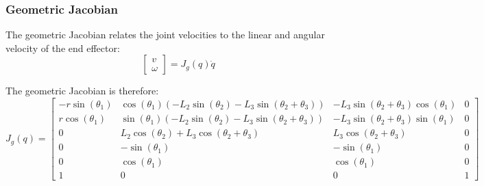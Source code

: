 \documentclass[12pt,a4paper]{article}
\begin{document}
\subsubsection*{Geometric Jacobian}
The geometric Jacobian relates the joint velocities to the linear and angular
velocity of the end effector:
\[ \begin{bmatrix} v \\ \omega \end{bmatrix} = J_g(q) \dot{q} \]

The geometric Jacobian is therefore:
\[
J_g(q) = \begin{bmatrix}
-r \sin(\theta_1) & \cos(\theta_1)(-L_2 \sin(\theta_2) - L_3 \sin(\theta_2 + \theta_3)) & -L_3 \sin(\theta_2 + \theta_3) \cos(\theta_1) & 0 \\
r \cos(\theta_1) & \sin(\theta_1)(-L_2 \sin(\theta_2) - L_3 \sin(\theta_2 + \theta_3)) & -L_3 \sin(\theta_2 + \theta_3) \sin(\theta_1) & 0 \\
0 & L_2 \cos(\theta_2) + L_3 \cos(\theta_2 + \theta_3) & L_3 \cos(\theta_2 + \theta_3) & 0 \\
0 & -\sin(\theta_1) & -\sin(\theta_1) & 0 \\
0 & \cos(\theta_1) & \cos(\theta_1) & 0 \\
1 & 0 & 0 & 1
\end{bmatrix}
\]


\end{document}
